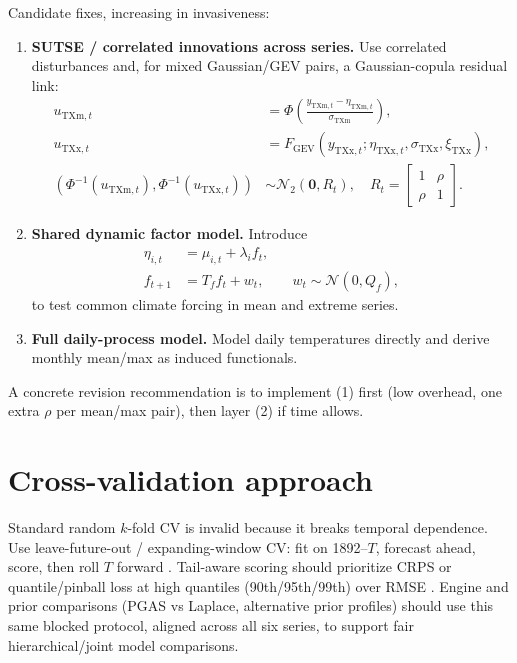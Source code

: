 \documentclass[11pt]{article}
\begin{document}
Candidate fixes, increasing in invasiveness:
\begin{enumerate}
\item \textbf{SUTSE / correlated innovations across series.} Use correlated disturbances and, for mixed Gaussian/GEV pairs, a Gaussian-copula residual link:
\begin{align}
u_{\mathrm{TXm},t} &= \Phi\!\left(\frac{y_{\mathrm{TXm},t}-\eta_{\mathrm{TXm},t}}{\sigma_{\mathrm{TXm}}}\right), \\
u_{\mathrm{TXx},t} &= F_{\mathrm{GEV}}\!\left(y_{\mathrm{TXx},t};\eta_{\mathrm{TXx},t},\sigma_{\mathrm{TXx}},\xi_{\mathrm{TXx}}\right), \\
\left(\Phi^{-1}(u_{\mathrm{TXm},t}),\Phi^{-1}(u_{\mathrm{TXx},t})\right)
&\sim \mathcal{N}_2\!\left(\mathbf{0},R_t\right),
\quad
R_t=\begin{bmatrix}1&\rho\\\rho&1\end{bmatrix}.
\end{align}
\item \textbf{Shared dynamic factor model.} Introduce
\begin{align}
\eta_{i,t} &= \mu_{i,t}+\lambda_i f_t, \\
f_{t+1} &= T_f f_t + w_t,\qquad w_t\sim\mathcal{N}(0,Q_f),
\end{align}
to test common climate forcing in mean and extreme series.
\item \textbf{Full daily-process model.} Model daily temperatures directly and derive monthly mean/max as induced functionals.
\end{enumerate}
A concrete revision recommendation is to implement (1) first (low overhead, one extra $\rho$ per mean/max pair), then layer (2) if time allows.

\section{Cross-validation approach}
Standard random $k$-fold CV is invalid because it breaks temporal dependence. Use leave-future-out / expanding-window CV: fit on 1892--$T$, forecast ahead, score, then roll $T$ forward \cite{burkner2020}. Tail-aware scoring should prioritize CRPS or quantile/pinball loss at high quantiles (90th/95th/99th) over RMSE \cite{gneiting2007}. Engine and prior comparisons (PGAS vs Laplace, alternative prior profiles) should use this same blocked protocol, aligned across all six series, to support fair hierarchical/joint model comparisons.
\end{document}
